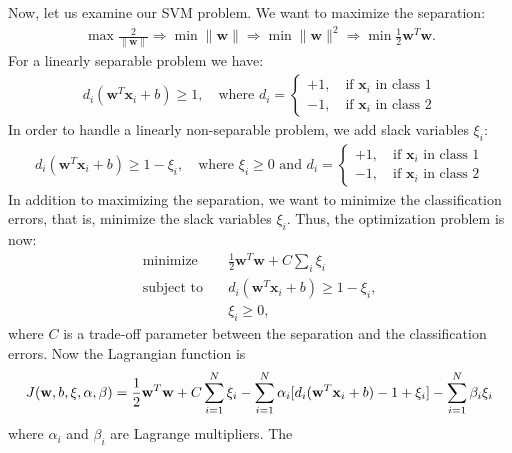 \begin{enumerate}
\begin{solution}
    Now, let us examine our SVM problem.  We want to maximize the
    separation:
    \begin{align*}
      \max \frac{2}{\|\mathbf{w}\|} \Rightarrow \min \|\mathbf{w}\|
      \Rightarrow \min \|\mathbf{w}\|^2 \Rightarrow \min
      \frac{1}{2} \mathbf{w}^T\mathbf{w}.
    \end{align*}
    For a linearly separable problem we have:
    \begin{align*}
      d_i(\mathbf{w}^T\mathbf{x}_i + b) \geq 1, \quad \text{where }
      d_i =
      \begin{cases}
        +1, \quad \text{if } \mathbf{x}_i \text{ in class 1}
        \\
        -1, \quad \text{if } \mathbf{x}_i \text{ in class 2}
      \end{cases}
    \end{align*}
    In order to handle a linearly non-separable problem, we add slack
    variables $\xi_i$:
    \begin{align*}
      d_i(\mathbf{w}^T\mathbf{x}_i + b) \geq 1 - \xi_i, \quad
      \text{where } \xi_i \geq 0 \text{ and } d_i =
      \begin{cases}
        +1, \quad \text{if } \mathbf{x}_i \text{ in class 1}
        \\
        -1, \quad \text{if } \mathbf{x}_i \text{ in class 2}
      \end{cases}
    \end{align*}
    In addition to maximizing the separation, we want to minimize the
    classification errors, that is, minimize the slack variables
    $\xi_i$.  Thus, the optimization problem is now:
    \begin{align*}
      \text{minimize} &\quad \frac{1}{2} \mathbf{w}^T\mathbf{w} + C
      \sum_i \xi_i
      \\
      \text{subject to} &\quad d_i(\mathbf{w}^T\mathbf{x}_i + b) \geq
      1 - \xi_i,
      \\
      &\quad
      \xi_i \geq 0,
    \end{align*}
    where $C$ is a trade-off parameter between the separation and the
    classification errors.  Now the Lagrangian function is
    \begin{align*}
      J(\mathbf{w}, b, \xi, \alpha, \beta) = \frac{1}{2}\mathbf{w}^T\mathbf{w} + C
      \sum_{i=1}^N \xi_i - \sum_{i=1}^N \alpha_i[d_i(\mathbf{w}^T \mathbf{x}_i + b) -
      1 + \xi_i] - \sum_{i=1}^N \beta_i \xi_i
    \end{align*}
    where $\alpha_i$ and $\beta_i$ are Lagrange multipliers.  The

\end{solution}
\end{enumerate}
